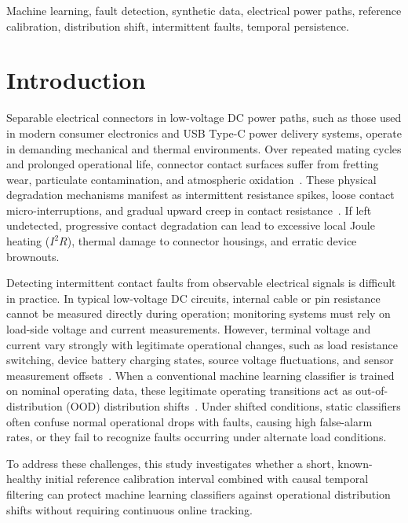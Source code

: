 \documentclass[conference]{IEEEtran}
\begin{document}
\begin{IEEEkeywords}
Machine learning, fault detection, synthetic data, electrical power paths, reference calibration, distribution shift, intermittent faults, temporal persistence.
\end{IEEEkeywords}

\section{Introduction}
Separable electrical connectors in low-voltage DC power paths, such as those used in modern consumer electronics and USB Type-C power delivery systems, operate in demanding mechanical and thermal environments. Over repeated mating cycles and prolonged operational life, connector contact surfaces suffer from fretting wear, particulate contamination, and atmospheric oxidation~\cite{slade2014electrical, maul2001intermittency}. These physical degradation mechanisms manifest as intermittent resistance spikes, loose contact micro-interruptions, and gradual upward creep in contact resistance~\cite{qi2008nofault}. If left undetected, progressive contact degradation can lead to excessive local Joule heating ($I^2 R$), thermal damage to connector housings, and erratic device brownouts.

Detecting intermittent contact faults from observable electrical signals is difficult in practice. In typical low-voltage DC circuits, internal cable or pin resistance cannot be measured directly during operation; monitoring systems must rely on load-side voltage and current measurements. However, terminal voltage and current vary strongly with legitimate operational changes, such as load resistance switching, device battery charging states, source voltage fluctuations, and sensor measurement offsets~\cite{gao2015survey1}. When a conventional machine learning classifier is trained on nominal operating data, these legitimate operating transitions act as out-of-distribution (OOD) distribution shifts~\cite{lu2019learning}. Under shifted conditions, static classifiers often confuse normal operational drops with faults, causing high false-alarm rates, or they fail to recognize faults occurring under alternate load conditions.

To address these challenges, this study investigates whether a short, known-healthy initial reference calibration interval combined with causal temporal filtering can protect machine learning classifiers against operational distribution shifts without requiring continuous online tracking. 
\end{document}
